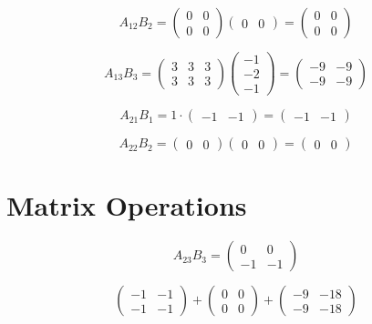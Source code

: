 \[
A_{12} B_2 = \begin{pmatrix}
0 & 0 \\
0 & 0
\end{pmatrix}
\begin{pmatrix}
0 & 0
\end{pmatrix}
= \begin{pmatrix}
0 & 0 \\
0 & 0
\end{pmatrix}
\]

\[
A_{13} B_3 = \begin{pmatrix}
3 & 3 & 3 \\
3 & 3 & 3
\end{pmatrix}
\begin{pmatrix}
-1 \\
-2 \\
-1
\end{pmatrix}
= \begin{pmatrix}
-9 & -9 \\
-9 & -9
\end{pmatrix}
\]

\[
A_{21} B_1 = 1 \cdot \begin{pmatrix}
-1 & -1
\end{pmatrix}
= \begin{pmatrix}
-1 & -1
\end{pmatrix}
\]

\[
A_{22} B_2 = \begin{pmatrix}
0 & 0
\end{pmatrix}
\begin{pmatrix}
0 & 0
\end{pmatrix}
= \begin{pmatrix}
0 & 0
\end{pmatrix}
\]

\section{Matrix Operations}
\[
A_{23} B_{3} = \begin{pmatrix}
0 & 0 \\
-1 & -1
\end{pmatrix}
\]

\[
\begin{pmatrix}
-1 & -1 \\
-1 & -1
\end{pmatrix}
+ \begin{pmatrix}
0 & 0 \\
0 & 0
\end{pmatrix}
+ \begin{pmatrix}
-9 & -18 \\
-9 & -18
\end{pmatrix}
\]

